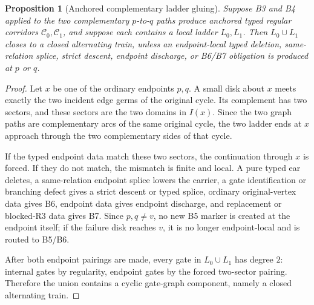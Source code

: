 \documentclass[11pt]{amsart}
\newtheorem{proposition}[theorem]{Proposition}
\theoremstyle{definition}
\begin{document}
\begin{proposition}[Anchored complementary ladder gluing]
Suppose B3 and B4 applied to the two complementary \(p\)-to-\(q\) paths produce anchored typed regular corridors \(\mathcal C_0,\mathcal C_1\), and suppose each contains a local ladder \(L_0,L_1\). Then \(L_0\cup L_1\) closes to a closed alternating train, unless an endpoint-local typed deletion, same-relation splice, strict descent, endpoint discharge, or B6/B7 obligation is produced at \(p\) or \(q\).

\end{proposition}
\begin{proof}
Let \(x\) be one of the ordinary endpoints \(p,q\). A small disk about \(x\) meets exactly the two incident edge germs of the original cycle. Its complement has two sectors, and these sectors are the two domains in \(I(x)\). Since the two graph paths are complementary arcs of the same original cycle, the two ladder ends at \(x\) approach through the two complementary sides of that cycle.

If the typed endpoint data match these two sectors, the continuation through \(x\) is forced. If they do not match, the mismatch is finite and local. A pure typed ear deletes, a same-relation endpoint splice lowers the carrier, a gate identification or branching defect gives a strict descent or typed splice, ordinary original-vertex data gives B6, endpoint data gives endpoint discharge, and replacement or blocked-R3 data gives B7. Since \(p,q\ne v\), no new B5 marker is created at the endpoint itself; if the failure disk reaches \(v\), it is no longer endpoint-local and is routed to B5/B6.

After both endpoint pairings are made, every gate in \(L_0\cup L_1\) has degree \(2\): internal gates by regularity, endpoint gates by the forced two-sector pairing. Therefore the union contains a cyclic gate-graph component, namely a closed alternating train.

\end{proof}
\end{document}
